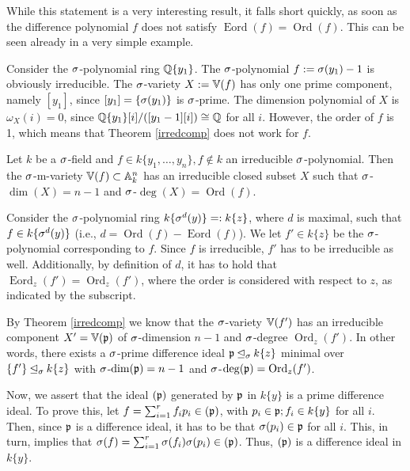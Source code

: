 While this statement is a very interesting result, it falls short quickly, as soon as the difference polynomial $f$ does not satisfy  $\operatorname{Eord}(f) = \operatorname{Ord}(f)$. This can be seen already in a very simple example.

\begin{ex}
Consider the $\sigma$-polynomial ring $\mathbb{Q}\{y_1\}$. The $\sigma$-polynomial $f := \sigma(y_1) - 1$ is obviously irreducible. The $\sigma$-variety $X:= \mathbb{V}(f)$ has only one prime component, namely $[y_1]$, since $[y_1] = \{ \sigma(y_1) \}$ is $\sigma$-prime.
The dimension polynomial of $X$ is $\omega_X(i) = 0$, since $\mathbb{Q}\{y_1\}[i]/([y_1 - 1][i]) \cong \mathbb{Q}$ for all $i$. However, the order of $f$ is 1, which means that Theorem \ref{irredcomp} does not work for $f$. 
\end{ex}

\begin{theorem}\label{corfinal}
Let $k$ be a $\sigma$-field and $f \in k\{y_1,\ldots,y_n\}, f \notin k$ an irreducible $\sigma$-polynomial. 
Then the $\sigma$-m-variety $\mathbb{V}(f) \subset \mathbb{A}_k^n$ has an irreducible closed subset $X$ such that $\sigma$-$\dim(X) = n-1$ and $\sigma$-$\operatorname{deg}(X) = \operatorname{Ord}(f)$.
\begin{bew}
Consider the $\sigma$-polynomial ring $k\{\sigma^d(y)\} =: k\{z\}$, where $d$ is maximal, such that $f \in k\{\sigma^d(y)\}$ (i.e., $d = \operatorname{Ord}(f) - \operatorname{Eord}(f)$). We let $f'\in k\{z\}$ be the $\sigma$-polynomial corresponding to $f$. 
Since $f$ is irreducible, $f'$ has to be irreducible as well. Additionally, by definition of $d$, it has to hold that $\operatorname{Eord}_z(f') = \operatorname{Ord}_z(f')$, where the order is considered with respect to $z$,
as indicated by the subscript. 

By Theorem \ref{irredcomp} we know that the $\sigma$-variety $ \mathbb{V}(f')$ has an irreducible component $X' = \mathbb{V}(\mathfrak{p})$ of $\sigma$-dimension $n-1$ and $\sigma$-degree $\operatorname{Ord}_z(f')$. In other words, there exists a $\sigma$-prime difference ideal $\mathfrak{p} \unlhd_{\sigma} k\{z\}$ minimal over $\{f'\} \unlhd_{\sigma} k\{z\}$ with
$\sigma$-$\dim(\mathfrak{p}) = n-1$ and $\sigma$-$\operatorname{deg}(\mathfrak{p}) = \operatorname{Ord}_z(f')$. 

Now, we assert that the ideal $(\mathfrak{p})$ generated by $\mathfrak{p}$ in $k\{y\}$ is a prime difference ideal. 
To prove this, let $f = \sum_{i=1}^r f_i p_i \in (\mathfrak{p})$, with $p_i \in \mathfrak{p}; f_i \in k\{y\}$ for all $i$. Then, since $\mathfrak{p}$ is a difference ideal, it has to be that $\sigma(p_i) \in \mathfrak{p}$ for all $i$.
This, in turn, implies that $\sigma(f) =  \sum_{i=1}^r \sigma(f_i) \sigma(p_i) \in (\mathfrak{p})$. Thus, $(\mathfrak{p})$ is a difference ideal in $k\{y\}$. 


\end{bew}
\end{theorem}
